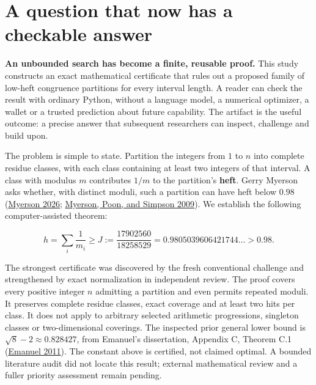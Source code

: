 \documentclass[11pt,a4paper]{article}
\begin{document}
\hypertarget{a-question-that-now-has-a-checkable-answer}{%
\section{A question that now has a checkable
answer}\label{a-question-that-now-has-a-checkable-answer}}

\textbf{An unbounded search has become a finite, reusable proof.} This
study constructs an exact mathematical certificate that rules out a
proposed family of low-heft congruence partitions for every interval
length. A reader can check the result with ordinary Python, without a
language model, a numerical optimizer, a wallet or a trusted prediction
about future capability. The artifact is the useful outcome: a precise
answer that subsequent researchers can inspect, challenge and build
upon.

The problem is simple to state. Partition the integers from \(1\) to
\(n\) into complete residue classes, with each class containing at least
two integers of that interval. A class with modulus \(m\) contributes
\(1/m\) to the partition's \textbf{heft}. Gerry Myerson asks whether,
with distinct moduli, such a partition can have heft below \(0.98\)
(\protect\hyperlink{ref-myerson2026}{Myerson 2026};
\protect\hyperlink{ref-myerson2009}{Myerson, Poon, and Simpson 2009}).
We establish the following computer-assisted theorem:

\begin{samepage}

\[
\boxed{\displaystyle h=\sum_i\frac{1}{m_i}\ge
J:=\frac{17902560}{18258529}
=0.9805039606421744\ldots>0.98.}
\]

\end{samepage}

The strongest certificate was discovered by the fresh conventional
challenge and strengthened by exact normalization in independent review.
The proof covers every positive integer \(n\) admitting a partition and
even permits repeated moduli. It preserves complete residue classes,
exact coverage and at least two hits per class. It does not apply to
arbitrary selected arithmetic progressions, singleton classes or
two-dimensional coverings. The inspected prior general lower bound is
\(\sqrt8-2\approx0.828427\), from Emanuel's dissertation, Appendix C,
Theorem C.1 (\protect\hyperlink{ref-emanuel2011}{Emanuel 2011}). The
constant above is certified, not claimed optimal. A bounded literature
audit did not locate this result; external mathematical review and a
fuller priority assessment remain pending.
\end{document}

